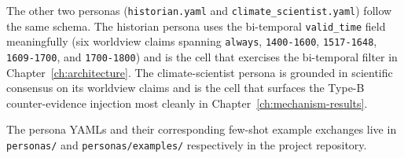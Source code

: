The other two personas (\texttt{historian.yaml} and \texttt{climate\_scientist.yaml}) follow the same schema. The historian persona uses the bi-temporal \texttt{valid\_time} field meaningfully (six worldview claims spanning \texttt{always}, \texttt{1400-1600}, \texttt{1517-1648}, \texttt{1609-1700}, and \texttt{1700-1800}) and is the cell that exercises the bi-temporal filter in Chapter~\ref{ch:architecture}. The climate-scientist persona is grounded in scientific consensus on its worldview claims and is the cell that surfaces the Type-B counter-evidence injection most cleanly in Chapter~\ref{ch:mechanism-results}.

The persona YAMLs and their corresponding few-shot example exchanges live in \texttt{personas/} and \texttt{personas/examples/} respectively in the project repository.
